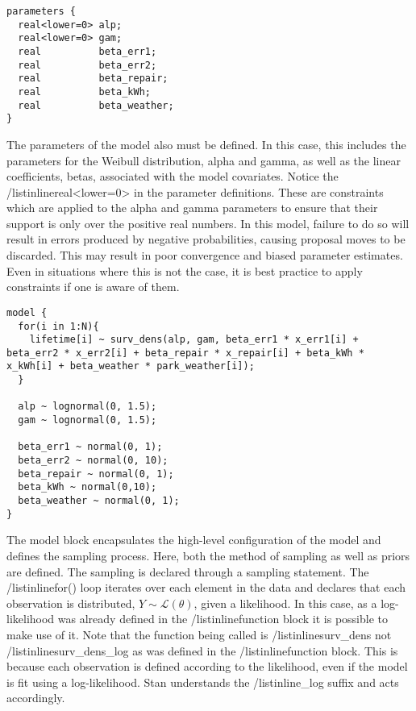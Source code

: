 \begin{lstlisting}
parameters {
  real<lower=0> alp;
  real<lower=0> gam;
  real          beta_err1;
  real          beta_err2;
  real          beta_repair;
  real          beta_kWh;
  real          beta_weather;
}
\end{lstlisting}


The parameters of the model also must be defined. In this case, this includes the parameters for the Weibull distribution, alpha and gamma, as well as the linear coefficients, betas, associated with the model covariates. Notice the /listinline{real<lower=0>} in the parameter definitions. These are constraints which are applied to the alpha and gamma parameters to ensure that their support is only over the positive real numbers. In this model, failure to do so will result in errors produced by negative probabilities, causing proposal moves to be discarded. This may result in poor convergence and biased parameter estimates. Even in situations where this is not the case, it is best practice to apply constraints if one is aware of them.


\begin{lstlisting}
model {
  for(i in 1:N){
    lifetime[i] ~ surv_dens(alp, gam, beta_err1 * x_err1[i] + beta_err2 * x_err2[i] + beta_repair * x_repair[i] + beta_kWh * x_kWh[i] + beta_weather * park_weather[i]);
  }

  alp ~ lognormal(0, 1.5);
  gam ~ lognormal(0, 1.5);
  
  beta_err1 ~ normal(0, 1);
  beta_err2 ~ normal(0, 10);
  beta_repair ~ normal(0, 1);
  beta_kWh ~ normal(0,10);
  beta_weather ~ normal(0, 1);
}
\end{lstlisting}


The model block encapsulates the high-level configuration of the model and defines the sampling process. Here, both the method of sampling as well as priors are defined. The sampling is declared through a sampling statement. The /listinline{for()} loop iterates over each element in the data and declares that each observation is distributed, $Y \sim \mathcal {L}(\theta)$,  given a likelihood. In this case, as a log-likelihood was already defined in the /listinline{function} block it is possible to make use of it. Note that the function being called is /listinline{surv_dens} not /listinline{surv\_dens\_log} as was defined in the /listinline{function} block. This is because each observation is defined according to the likelihood, even if the model is fit using a log-likelihood. Stan understands the /listinline{\_log} suffix and acts accordingly. 


